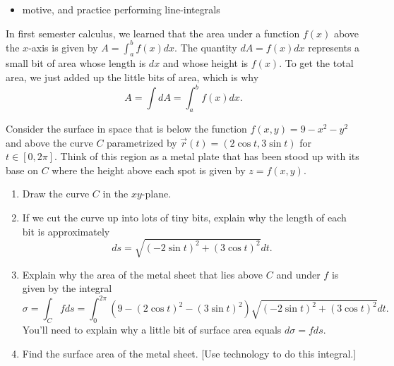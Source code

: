 \begin{itemize}
\item motive, and practice performing line-integrals
\end{itemize}


In first semester calculus, we learned that the area under a function $f(x)$ above the $x$-axis is given by $A = \int_a^b f(x) dx$.  The quantity $dA= f(x) dx$ represents a small bit of area whose length is $dx$ and whose height is $f(x)$.  To get the total area, we just added up the little bits of area, which is why 
$$A=\int dA = \int_a^b f(x) dx.$$

\begin{problem}
%
%
 Consider the surface in space that is below the function 
$f(x,y)=9-x^2-y^2$ and above the curve $C$ parametrized by 
$\vec r(t)=(2\cos t, 3\sin t)$ for $t\in[0,2\pi]$.  Think of this region as a metal plate that has been stood up with its base on $C$ where the height above each spot is given by $z=f(x,y)$.
\begin{enumerate}
	\item {}%
  Draw the curve $C$ in the $xy$-plane. 
	\item If we cut the curve up into lots of tiny bits, explain why the length of each bit is approximately $$ds=\sqrt{(-2\sin t)^2+(3\cos t)^2}dt.$$
 \item Explain why the area of the metal sheet that lies above $C$ and under $f$ is given by the integral
$$\sigma = \int_C f ds = \int_0^{2\pi}(9-(2\cos t)^2-(3\sin t)^2)\sqrt{(-2\sin t)^2+(3\cos t)^2}dt.$$
 You'll need to explain why a little bit of surface area equals $d\sigma =fds$. 
 \item
{}%
Find the surface area of the metal sheet. [Use technology to do this integral.] 
\end{enumerate}
\end{problem}



